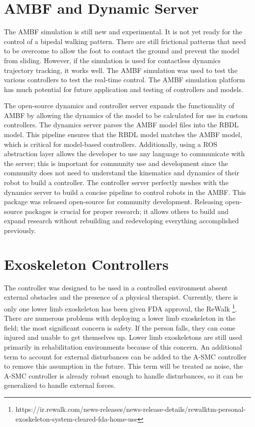 \section{AMBF and Dynamic Server}


The AMBF simulation is still new and experimental. It is not yet ready for the control of a bipedal walking pattern. There are still frictional patterns that need to be overcome to allow the foot to contact the ground and prevent the model from sliding. However, if the simulation is used for contactless dynamics trajectory tracking, it works well. The AMBF simulation was used to test the various controllers to test the real-time control. The AMBF simulation platform has much potential for future application and testing of controllers and models. 

The open-source dynamics and controller server expands the functionality of AMBF by allowing the dynamics of the model to be calculated for use in custom controllers. The dynamics server parses the AMBF model files into the RBDL model. This pipeline ensures that the RBDL model matches the AMBF model, which is critical for model-based controllers. Additionally, using a ROS abstraction layer allows the developer to use any language to communicate with the server; this is important for community use and development since the community does not need to understand the kinematics and dynamics of their robot to build a controller. The controller server perfectly meshes with the dynamics server to build a concise pipeline to control robots in the AMBF. This package was released open-source for community development. Releasing open-source packages is crucial for proper research; it allows others to build and expand research without rebuilding and redeveloping everything accomplished previously.   


\section{Exoskeleton Controllers}

The controller was designed to be used in a controlled environment absent external obstacles and the presence of a physical therapist. Currently, there is only one lower limb exoskeleton has been given FDA approval, the ReWalk \footnote{https://ir.rewalk.com/news-releases/news-release-details/rewalktm-personal-exoskeleton-system-cleared-fda-home-use}. There are numerous problems with deploying a lower limb exoskeleton in the field; the most significant concern is safety. If the person falls, they can come injured and unable to get themselves up. Lower limb exoskeletons are still used primarily in rehabilitation environments because of this concern. An additional term to account for external disturbances can be added to the A-SMC controller to remove this assumption in the future. This term will be treated as noise, the A-SMC controller is already robust enough to handle disturbances, so it can be generalized to handle external forces. 

